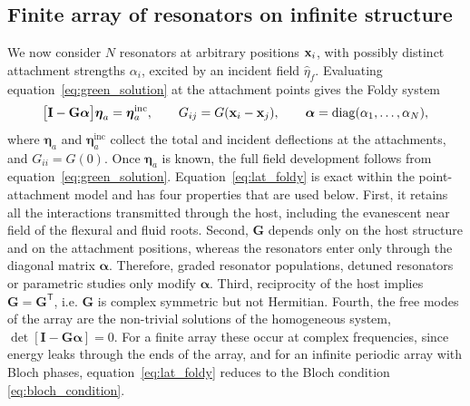 \subsection{Finite array of resonators on infinite structure}\label{subsec:finite_array}

We now consider $N$ resonators at arbitrary positions $\mathbf{x}_i$, with possibly distinct attachment strengths $\alpha_i$, excited by an incident field $\widehat{\eta}_f$. Evaluating equation~\eqref{eq:green_solution} at the attachment points gives the Foldy system \citep{foldy1945multiple,martin2006multiple}
\begin{equation}\label{eq:lat_foldy}
    \bigl[\mathbf{I}-\mathbf{G}\boldsymbol{\alpha}\bigr]\boldsymbol{\eta}_a=\boldsymbol{\eta}_a^{\mathrm{inc}},
    \qquad
    G_{ij}=G(\mathbf{x}_i-\mathbf{x}_j),
    \qquad
    \boldsymbol{\alpha}=\operatorname{diag}(\alpha_1,\ldots,\alpha_N),
\end{equation}
where $\boldsymbol{\eta}_a$ and $\boldsymbol{\eta}_a^{\mathrm{inc}}$ collect the total and incident deflections at the attachments, and $G_{ii}=G(0)$. Once $\boldsymbol{\eta}_a$ is known, the full field development follows from equation~\eqref{eq:green_solution}. Equation~\eqref{eq:lat_foldy} is exact within the point-attachment model and has four properties that are used below. First, it retains all the interactions transmitted through the host, including the evanescent near field of the flexural and fluid roots. Second, $\mathbf{G}$ depends only on the host structure and on the attachment positions, whereas the resonators enter only through the diagonal matrix $\boldsymbol{\alpha}$. Therefore, graded resonator populations, detuned resonators or parametric studies only modify $\boldsymbol{\alpha}$. Third, reciprocity of the host implies $\mathbf{G}=\mathbf{G}^{\mathsf{T}}$, i.e. $\mathbf{G}$ is complex symmetric but not Hermitian. Fourth, the free modes of the array are the non-trivial solutions of the homogeneous system, $\det[\mathbf{I}-\mathbf{G}\boldsymbol{\alpha}]=0$. For a finite array these occur at complex frequencies, since energy leaks through the ends of the array, and for an infinite periodic array with Bloch phases, equation~\eqref{eq:lat_foldy} reduces to the Bloch condition \eqref{eq:bloch_condition}.

